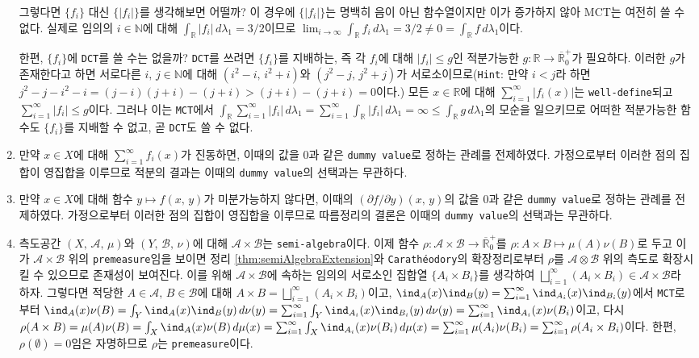 \begin{enumerate}[label = \textsf{\textbf{\arabic*}}]
    그렇다면 $\{f_i\}$ 대신 $\{|f_i|\}$를 생각해보면 어떨까? 이 경우에 $\{|f_i|\}$는 명백히 음이 아닌 함수열이지만 이가 증가하지 않아 MCT는 여전히 쓸 수 없다. 실제로 임의의 $i\in\mathbb{N}$에 대해 $\int_\mathbb{R}|f_i|\,d\lambda_1=3/2$이므로 $\lim_{i\to\infty}\int_\mathbb{R}f_i\,d\lambda_1=3/2\ne0=\int_\mathbb{R}f\,d\lambda_1$이다.
    
    한편, $\{f_i\}$에 \texttt{DCT}를 쓸 수는 없을까? \texttt{DCT}를 쓰려면 $\{f_i\}$를 지배하는, 즉 각 $f_i$에 대해 $|f_i|\leq g$인 적분가능한 $g:\mathbb{R}\to\overline{\mathbb{R}}_0^+$가 필요하다. 이러한 $g$가 존재한다고 하면 서로다른 $i,\,j\in\mathbb{N}$에 대해 $(i^2-i,\,i^2+i)$와 $(j^2-j,\,j^2+j)$가 서로소이므로(\texttt{Hint}: 만약 $i<j$라 하면 $j^2-j-i^2-i=(j-i)(j+i)-(j+i)>(j+i)-(j+i)=0$이다.) 모든 $x\in\mathbb{R}$에 대해 $\sum_{i=1}^\infty |f_i(x)|$는 \texttt{well-define}되고 $\sum_{i=1}^\infty |f_i|\leq g$이다. 그러나 이는 \texttt{MCT}에서 $\int_\mathbb{R}\sum_{i=1}^\infty |f_i|\,d\lambda_1=\sum_{i=1}^\infty\int_\mathbb{R}|f_i|\,d\lambda_1=\infty\leq\int_\mathbb{R}g\,d\lambda_1$의  모순을 일으키므로 어떠한 적분가능한 함수도 $\{f_i\}$를 지배할 수 없고, 곧 \texttt{DCT}도 쓸 수 없다.
    \item 만약 $x\in X$에 대해 $\sum_{i=1}^\infty f_i(x)$가 진동하면, 이때의 값을 $0$과 같은 \texttt{dummy value}로 정하는 관례를 전제하였다. 가정으로부터 이러한 점의 집합이 영집합을 이루므로 적분의 결과는 이때의 \texttt{dummy value}의 선택과는 무관하다.
    \item 만약 $x\in X$에 대해 함수 $y\mapsto f(x,\,y)$가 미분가능하지 않다면, 이때의 $(\partial f/\partial y)(x,\,y)$의 값을 $0$과 같은 \texttt{dummy value}로 정하는 관례를 전제하였다. 가정으로부터 이러한 점의 집합이 영집합을 이루므로 따름정리의 결론은 이때의 \texttt{dummy value}의 선택과는 무관하다.
    \item 측도공간 $(X,\,\mathcal{A},\,\mu)$와 $(Y,\,\mathcal{B},\,\nu)$에 대해 $\mathcal{A}\times\mathcal{B}$는 \texttt{semi-algebra}이다. 이제 함수 $\rho:\mathcal{A}\times\mathcal{B}\to\overline{\mathbb{R}}^+_0$를 $\rho:A\times B\mapsto\mu(A)\nu(B)$로 두고 이가 $\mathcal{A}\times\mathcal{B}$ 위의 \texttt{premeasure}임을 보이면 정리 \ref{thm:semiAlgebraExtension}와 \texttt{Carath\'eodory}의 확장정리로부터 $\rho$를 $\mathcal{A}\otimes\mathcal{B}$ 위의 측도로 확장시킬 수 있으므로 존재성이 보여진다. 이를 위해 $\mathcal{A}\times\mathcal{B}$에 속하는 임의의 서로소인 집합열 $\{A_i\times B_i\}$를 생각하여 $\bigsqcup_{i=1}^\infty(A_i\times B_i)\in\mathcal{A}\times\mathcal{B}$라 하자. 그렇다면 적당한 $A\in\mathcal{A},\,B\in\mathcal{B}$에 대해 $A\times B=\bigsqcup_{i=1}^\infty(A_i\times B_i)$이고, $\ind_A(x)\ind_B(y)=\sum_{i=1}^\infty\ind_{A_i}(x)\ind_{B_i}(y)$에서 \texttt{MCT}로부터 $\ind_A(x)\nu(B)=\int_Y\ind_A(x)\ind_B(y)\,d\nu(y)=\sum_{i=1}^\infty\int_Y\ind_{A_i}(x)\ind_{B_i}(y)\,d\nu(y)=\sum_{i=1}^\infty\ind_{A_i}(x)\nu(B_i)$이고, 다시 $\rho(A\times B)=\mu(A)\nu(B)=\int_X\ind_A(x)\nu(B)\,d\mu(x)=\sum_{i=1}^\infty\int_X\ind_{A_i}(x)\nu(B_i)\,d\mu(x)=\sum_{i=1}^\infty\mu(A_i)\nu(B_i)=\sum_{i=1}^\infty\rho(A_i\times B_i)$이다. 한편, $\rho(\emptyset)=0$임은 자명하므로 $\rho$는 \texttt{premeasure}이다.

\end{enumerate}
